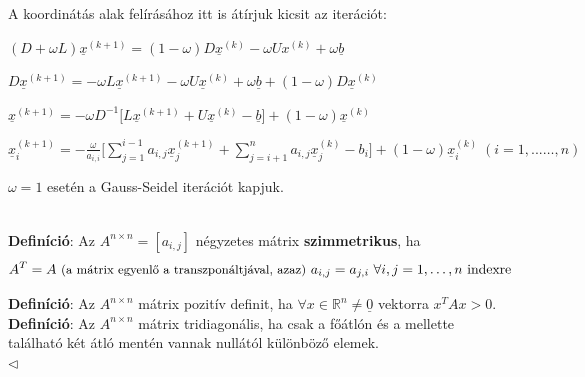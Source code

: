 \documentclass[tikz,12pt,margin=0px]{article}
\newcommand\ddfrac[2]{\frac{\displaystyle #1}{\displaystyle #2}}
\newcommand{\mybox}{%
    \collectbox{%
        \setlength{\fboxsep}{4pt}%
        \fbox{\BOXCONTENT}%
    }%
}
\begin{document}
    \noindent A koordinátás alak felírásához itt is átírjuk kicsit az iterációt:
	
	\begin{center}
		\small $(D + \omega L)\underline{x}^{(k+1)} = (1 - \omega)D\underline{x}^{(k)} -\omega Ux^{(k)} + \omega \underline{b}$
	\end{center}
	
	\begin{center}
		\small $D\underline{x}^{(k+1)} =  -\omega L\underline{x}^{(k+1)} -\omega U\underline{x}^{(k)} + \omega \underline{b} + (1 - \omega)D\underline{x}^{(k)}$
	\end{center}
	
	\begin{center}
		\small $\underline{x}^{(k+1)} = -\omega D^{-1} \big[L\underline{x}^{(k+1)} + U\underline{x}^{(k)} - \underline{b} \big] + (1 - \omega)\underline{x}^{(k)}$
	\end{center}
	
	\begin{center}
        \mybox{
		$\underline{x}^{(k+1)}_{i} =
		-\ddfrac{\omega}{a_{i,i}}
		\Bigg[
		\sum_{j=1}^{i-1} a_{i,j}\underline{x}_{j}^{(k+1)} +
		\sum_{j=i+1}^{n} a_{i,j}\underline{x}_{j}^{(k)}	-
		b_{i}
		\Bigg] +
		(1 - \omega) \underline{x}_{i}^{(k)}
		\; (i = 1, ...\ldots, n)$}
	\end{center}
	
	\noindent $\omega = 1$ esetén a Gauss-Seidel iterációt kapjuk.\\

    {\footnotesize \noindent {\color{blue} \faLightbulbO\ $\triangleright$ } }
    {\footnotesize\\
    \noindent \textbf{Definíció}: Az $A^{n \times n}=\left[ a_{i,j} \right]$ négyzetes mátrix \textbf{szimmetrikus}, ha
    \[
        A^{T} = A\ \text{\small (a mátrix egyenlő a transzponáltjával, azaz)}\ a_{i,j} = a_{j,i}\ \forall i,j = 1,\ldots,n\ \text{indexre}
    \]

    \noindent \textbf{Definíció}: Az $A^{n \times n}$ mátrix pozitív definit, ha $\forall x \in \mathbb{R}^{n} \neq \underline{0}$ vektorra $x^{T}Ax > 0.$\\

    \noindent \textbf{Definíció}: Az $A^{n \times n}$ mátrix tridiagonális, ha csak a főátlón és a mellette található két átló mentén vannak nullától különböző elemek.\\
    \noindent $\triangleleft$ \faLightbulbO}\\
\end{document}
